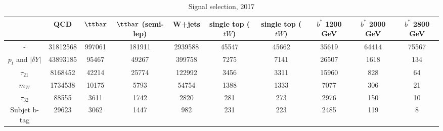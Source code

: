 \begin{table}[] 
\begin{tabular}{|c|ccccccccc|} 
\hline 
 &QCD	& $\ttbar$	& $\ttbar$ (semi-lep)	& W+jets	& single top ($tW$)	& single top ($\bar{t}W$)	& $b^{*}$ 1200 GeV	& $b^{*}$ 2000 GeV	& $b^{*}$ 2800 GeV	\\ 
\hline 
	-	& 31812568	& 997061	& 181911	& 2939588	& 45547	& 45662	& 35619	& 64414	& 75567	\\ 
	$p_{t}$ and $|\delta Y|$	& 43893185	& 95467	& 49267	& 399758	& 7275	& 7141	& 26507	& 1618	& 134	\\ 
	$\tau_{21}$	& 8168452	& 42214	& 25774	& 122992	& 3456	& 3311	& 15960	& 828	& 64	\\ 
	$m_{W}$	& 1734538	& 10175	& 5793	& 54754	& 1388	& 1333	& 7077	& 306	& 21	\\ 
	$\tau_{32}$	& 88555	& 3611	& 1742	& 2820	& 281	& 273	& 2976	& 150	& 10	\\ 
	Subjet b-tag	& 29623	& 3062	& 1447	& 982	& 231	& 223	& 2485	& 119	& 8	\\ 
\hline 
\end{tabular} 
\caption{Signal selection, 2017} 
\end{table}